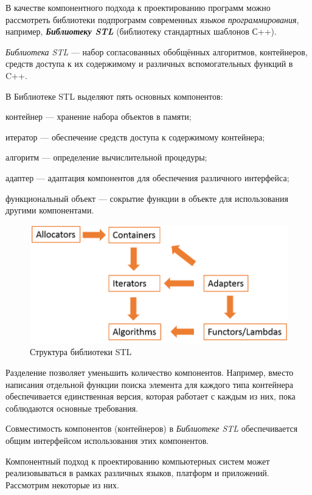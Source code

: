 В качестве компонентного подхода к проектированию программ можно рассмотреть библиотеки подпрограмм современных \textit{языков программирования}, например, \textbf{\textit{Библиотеку STL}} (библиотеку стандартных шаблонов С++).

\textit{Библиотека STL} --- набор согласованных обобщённых алгоритмов, контейнеров, средств доступа к их содержимому и различных вспомогательных функций в C++.

В Библиотеке STL выделяют пять основных компонентов:
\begin{textitemize}
	\item контейнер --- хранение набора объектов в памяти;
	\item итератор --- обеспечение средств доступа к содержимому контейнера;
	\item алгоритм --- определение вычислительной процедуры;
	\item адаптер --- адаптация компонентов для обеспечения различного интерфейса;
	\item функциональный объект --- сокрытие функции в объекте для использования другими компонентами.
\end{textitemize}

\begin{figure}[H]
	\includegraphics[scale=0.7]{author/part5/figures/STL.png}
	\caption{Структура библиотеки STL}
	\label{fig:STL}
\end{figure}

Разделение позволяет уменьшить количество компонентов. Например, вместо написания отдельной функции поиска элемента для каждого типа контейнера обеспечивается единственная версия, которая работает с каждым из них, пока соблюдаются основные требования.

Совместимость компонентов (контейнеров) в \textit{Библиотеке STL} обеспечивается общим интерфейсом использования этих компонентов.

Компонентный подход к проектированию компьютерных систем может реализовываться в рамках различных языков, платформ и приложений. Рассмотрим некоторые из них.

